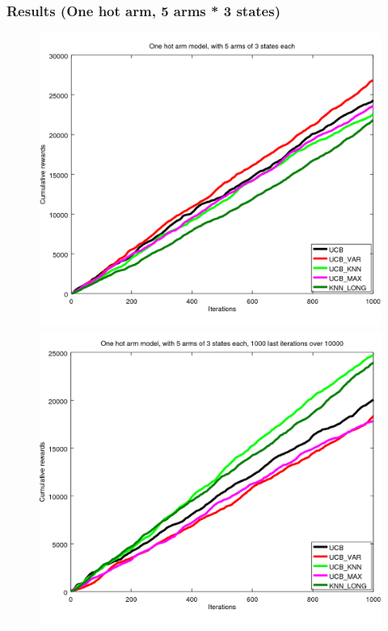 \documentclass[french]{beamer}
\begin{document}
\begin{frame}
	\frametitle{Results (One hot arm, 5 arms * 3 states)}
	
	\begin{figure}[h]
		\begin{minipage}[b]{.49\linewidth}
			\includegraphics[width=1.0\textwidth]{begin_s_1000it.png}
			
		\end{minipage}
		\hfill
		\begin{minipage}[b]{0.49\linewidth}
			\includegraphics[width=1.0\textwidth]{last_s_1000it.png}
			
		\end{minipage}
		\label{fig:f}
	\end{figure}
\end{frame}
\end{document}
